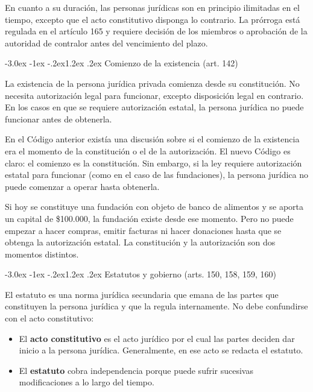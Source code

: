 \documentclass[12pt,oneside]{book}
\makeatletter
\renewcommand\section{\@startsection{section}{1}{\z@}%
  {-3.0ex \@plus -1ex \@minus -.2ex}{1.2ex \@plus .2ex}%
  {\normalfont\large\bfseries\color{acento}}}
\makeatother
\begin{document}
\begin{nota}
En cuanto a su duración, las personas jurídicas son en principio ilimitadas en el tiempo, excepto que el acto constitutivo disponga lo contrario. La prórroga está regulada en el artículo 165 y requiere decisión de los miembros o aprobación de la autoridad de contralor antes del vencimiento del plazo.
\end{nota}

\section{Comienzo de la existencia (art. 142)}

\begin{definicion}
La existencia de la persona jurídica privada comienza desde su constitución. No necesita autorización legal para funcionar, excepto disposición legal en contrario. En los casos en que se requiere autorización estatal, la persona jurídica no puede funcionar antes de obtenerla.
\end{definicion}

En el Código anterior existía una discusión sobre si el comienzo de la existencia era el momento de la constitución o el de la autorización. El nuevo Código es claro: el comienzo es la constitución. Sin embargo, si la ley requiere autorización estatal para funcionar (como en el caso de las fundaciones), la persona jurídica no puede comenzar a operar hasta obtenerla.

\begin{ejemplo}
Si hoy se constituye una fundación con objeto de banco de alimentos y se aporta un capital de \$100.000, la fundación existe desde ese momento. Pero no puede empezar a hacer compras, emitir facturas ni hacer donaciones hasta que se obtenga la autorización estatal. La constitución y la autorización son dos momentos distintos.
\end{ejemplo}

\section{Estatutos y gobierno (arts. 150, 158, 159, 160)}

El estatuto es una norma jurídica secundaria que emana de las partes que constituyen la persona jurídica y que la regula internamente. No debe confundirse con el acto constitutivo:

\begin{itemize}
    \item El \textbf{acto constitutivo} es el acto jurídico por el cual las partes deciden dar inicio a la persona jurídica. Generalmente, en ese acto se redacta el estatuto.
    \item El \textbf{estatuto} cobra independencia porque puede sufrir sucesivas modificaciones a lo largo del tiempo.
\end{itemize}
\end{document}
